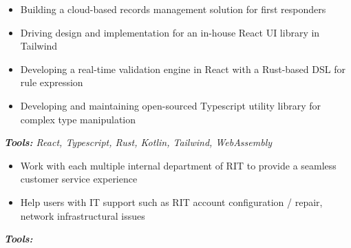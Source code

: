 \begin{itemize}
  \item Building a cloud-based records management solution for first responders
  \item Driving design and implementation for an in-house React UI library in Tailwind
  \item Developing a real-time validation engine in React with a Rust-based DSL for rule expression
  \item Developing and maintaining open-sourced Typescript utility library for complex type manipulation
\end{itemize}
\textit{\textbf{Tools:} React, Typescript, Rust, Kotlin, Tailwind, WebAssembly}

\divider

\begin{itemize}
  \item Work with each multiple internal department of RIT to provide a seamless customer service experience
  \item Help users with IT support such as RIT account configuration / repair, network infrastructural issues
\end{itemize}
\textit{\textbf{Tools:} }
